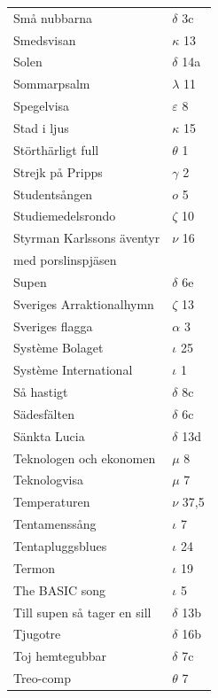 \documentclass[a6paper,10pt]{article}
\begin{document}
\newpage
\begin{table}[!h]
\begin{tabular}{l l}
Små nubbarna&	$\delta$ 3c\\
Smedsvisan	&$\kappa$ 13\\
Solen	&$\delta$ 14a\\
Sommarpsalm	&$\lambda$ 11\\
Spegelvisa&	$\varepsilon$ 8\\
Stad i ljus&       $\kappa$ 15\\
Störthärligt full&	$\theta$ 1\\
Strejk på Pripps&	$\gamma$ 2\\
Studentsången&	$o$ 5\\
Studiemedelsrondo&$\zeta$ 10\\
Styrman Karlssons äventyr &$\nu$ 16\\
med porslinspjäsen	&\\
Supen	&$\delta$ 6e\\
Sveriges Arraktionalhymn	&$\zeta$ 13\\
Sveriges flagga	&$\alpha$ 3\\
Système Bolaget&	$\iota$ 25\\
Système International&	$\iota$ 1\\
Så hastigt	&$\delta$ 8c\\
Sädesfälten	&$\delta$ 6c\\
Sänkta Lucia	&$\delta$ 13d\\
Teknologen och ekonomen&$\mu$ 8\\
Teknologvisa	&$\mu$ 7\\
Temperaturen	&$\nu$ 37,5\\
Tentamenssång&	$\iota$ 7\\
Tentapluggsblues&$\iota$ 24\\
Termon&	$\iota$ 19\\
The BASIC song	&$\iota$ 5\\
Till supen så tager en sill	&$\delta$ 13b\\
Tjugotre	&$\delta$ 16b\\
Toj hemtegubbar	&$\delta$ 7c\\
Treo-comp	&$\theta$ 7\\
\end{tabular}
\end{table}
\end{document}
